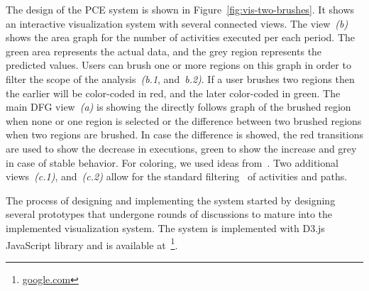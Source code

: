 The design of the PCE system is shown in Figure~\ref{fig:vis-two-brushes}. It shows an interactive visualization system with several connected views. The view~\emph{(b)} shows the area graph for the number of activities executed per each period. The green area represents the actual data, and the grey region represents the predicted values. Users can brush one or more regions on this graph in order to filter the scope of the analysis~\emph{(b.1}, and~\emph{b.2)}. If a user brushes two regions then the earlier will be color-coded in red, and the later color-coded in green. The main DFG view~\emph{(a)} is showing the directly follows graph of the brushed region when none or one region is selected or the difference between two brushed regions when two regions are brushed. In case the difference is showed, the red transitions are used to show the decrease in executions, green to show the increase and grey in case of stable behavior. For coloring, we used ideas from~\cite{DBLP:conf/grapp/KriglsteinR12}. Two additional views~\emph{(c.1)}, and~\emph{(c.2)} allow for the standard filtering~\cite{leemans2019directly} of activities and paths.

The process of designing and implementing the system started by designing several prototypes that undergone rounds of discussions to mature into the implemented visualization system. The system is implemented with D3.js JavaScript library and is available at~\footnote{\url{google.com}}.



%


